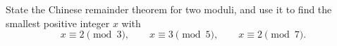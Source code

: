 State the Chinese remainder theorem for two moduli, and use it to find the smallest positive integer $x$ with
\[
x\equiv2\pmod3,\qquad x\equiv3\pmod5,\qquad x\equiv2\pmod7 .
\]
